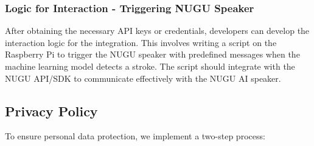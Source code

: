 \subsubsection{\textbf{Logic for Interaction - Triggering NUGU Speaker}}
After obtaining the necessary API keys or credentials, developers can develop the interaction logic for the integration. This involves writing a script on the Raspberry Pi to trigger the NUGU speaker with predefined messages when the machine learning model detects a stroke. The script should integrate with the NUGU API/SDK to communicate effectively with the NUGU AI speaker.\\


\subsection{\textbf{Privacy Policy}}
To ensure personal data protection, we implement a two-step process:\\


